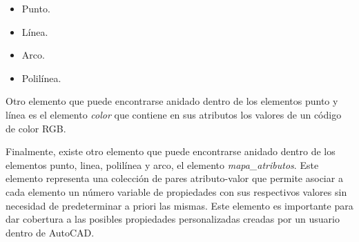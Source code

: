 \begin{itemize}

\item{Punto.}
\item{Línea.}
\item{Arco.}
\item{Polilínea.}

\end{itemize}

Otro elemento que puede encontrarse anidado dentro de los elementos punto y línea es el elemento \emph{color} que contiene en sus atributos los valores de un código de color RGB. 

Finalmente, existe otro elemento que puede encontrarse anidado dentro de los elementos punto, linea, polilínea y arco, el elemento \emph{mapa\_atributos}. Este elemento representa una colección de pares atributo-valor que permite asociar a cada elemento un número variable de propiedades con sus respectivos valores sin necesidad de predeterminar a priori las mismas. Este elemento es importante para dar cobertura a las posibles propiedades personalizadas creadas por un usuario dentro de AutoCAD.